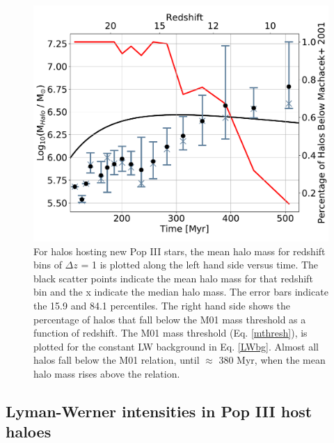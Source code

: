 \documentclass[fleqn,usenatbib]{mnras}
\begin{document}
\begin{figure}
	\includegraphics[width=\columnwidth]{images/mean_mass_errorb_fix.pdf}
    \caption{For halos hosting new Pop III stars, the mean halo mass for redshift bins of $\Delta z$ = 1 is plotted along the left hand side versus time. The black scatter points indicate the mean halo mass for that redshift bin and the x indicate the median halo mass. The error bars indicate the 15.9 and 84.1 percentiles. The right hand side shows the percentage of halos that fall below the M01 mass threshold as a function of redshift. The M01 mass threshold (Eq. \ref{mthresh}), is plotted for the constant LW background in Eq. \ref{LWbg}. Almost all halos fall below the M01 relation, until $\approx$ 380 Myr, when the mean halo mass rises above the relation.}
    \label{fig:mean_mass}
\end{figure}

\subsection{Lyman-Werner intensities in Pop III host haloes}
\end{document}
